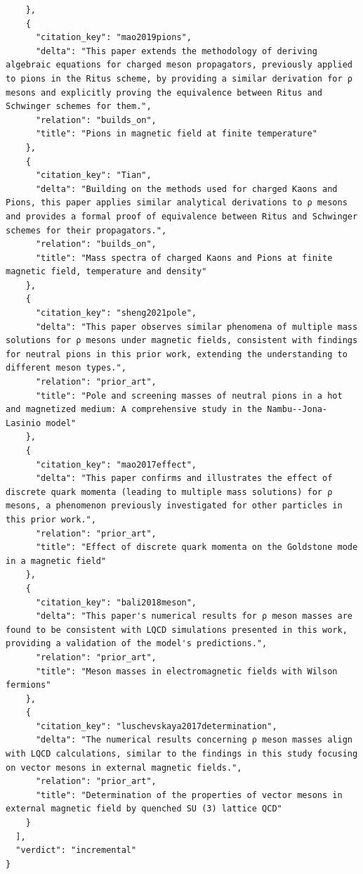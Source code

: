 \documentclass[11pt]{article}
\begin{document}
\begin{verbatim}
    },
    {
      "citation_key": "mao2019pions",
      "delta": "This paper extends the methodology of deriving algebraic equations for charged meson propagators, previously applied to pions in the Ritus scheme, by providing a similar derivation for ρ mesons and explicitly proving the equivalence between Ritus and Schwinger schemes for them.",
      "relation": "builds_on",
      "title": "Pions in magnetic field at finite temperature"
    },
    {
      "citation_key": "Tian",
      "delta": "Building on the methods used for charged Kaons and Pions, this paper applies similar analytical derivations to ρ mesons and provides a formal proof of equivalence between Ritus and Schwinger schemes for their propagators.",
      "relation": "builds_on",
      "title": "Mass spectra of charged Kaons and Pions at finite magnetic field, temperature and density"
    },
    {
      "citation_key": "sheng2021pole",
      "delta": "This paper observes similar phenomena of multiple mass solutions for ρ mesons under magnetic fields, consistent with findings for neutral pions in this prior work, extending the understanding to different meson types.",
      "relation": "prior_art",
      "title": "Pole and screening masses of neutral pions in a hot and magnetized medium: A comprehensive study in the Nambu--Jona-Lasinio model"
    },
    {
      "citation_key": "mao2017effect",
      "delta": "This paper confirms and illustrates the effect of discrete quark momenta (leading to multiple mass solutions) for ρ mesons, a phenomenon previously investigated for other particles in this prior work.",
      "relation": "prior_art",
      "title": "Effect of discrete quark momenta on the Goldstone mode in a magnetic field"
    },
    {
      "citation_key": "bali2018meson",
      "delta": "This paper's numerical results for ρ meson masses are found to be consistent with LQCD simulations presented in this work, providing a validation of the model's predictions.",
      "relation": "prior_art",
      "title": "Meson masses in electromagnetic fields with Wilson fermions"
    },
    {
      "citation_key": "luschevskaya2017determination",
      "delta": "The numerical results concerning ρ meson masses align with LQCD calculations, similar to the findings in this study focusing on vector mesons in external magnetic fields.",
      "relation": "prior_art",
      "title": "Determination of the properties of vector mesons in external magnetic field by quenched SU (3) lattice QCD"
    }
  ],
  "verdict": "incremental"
}
\end{verbatim}
\end{document}
